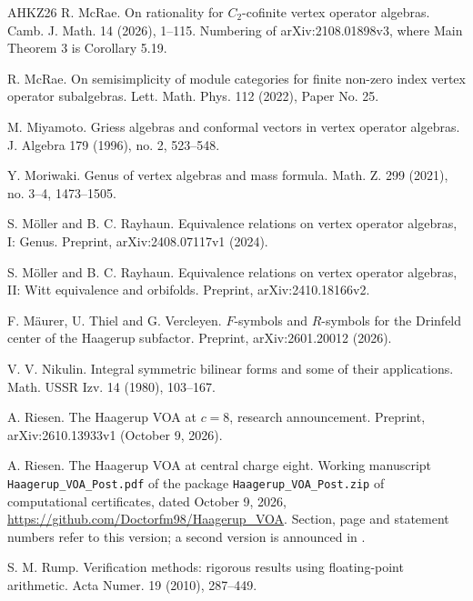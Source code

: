 \documentclass[leqno]{article}
\numberwithin{equation}{section}
\begin{document}
\begin{thebibliography}{AHKZ26}
R. McRae.
\newblock On rationality for $C_2$-cofinite vertex operator algebras.
\newblock Camb. J. Math. 14 (2026), 1--115. Numbering of arXiv:2108.01898v3, where Main Theorem 3 is Corollary 5.19.

R. McRae.
\newblock On semisimplicity of module categories for finite non-zero index vertex operator subalgebras.
\newblock Lett. Math. Phys. 112 (2022), Paper No. 25.

M. Miyamoto.
\newblock Griess algebras and conformal vectors in vertex operator algebras.
\newblock J. Algebra 179 (1996), no. 2, 523--548.

Y. Moriwaki.
\newblock Genus of vertex algebras and mass formula.
\newblock Math. Z. 299 (2021), no. 3--4, 1473--1505.

S. Möller and B. C. Rayhaun.
\newblock Equivalence relations on vertex operator algebras, I: Genus.
\newblock Preprint, arXiv:2408.07117v1 (2024).

S. Möller and B. C. Rayhaun.
\newblock Equivalence relations on vertex operator algebras, II: Witt equivalence and orbifolds.
\newblock Preprint, arXiv:2410.18166v2.

F. Mäurer, U. Thiel and G. Vercleyen.
\newblock $F$-symbols and $R$-symbols for the Drinfeld center of the Haagerup subfactor.
\newblock Preprint, arXiv:2601.20012 (2026).

V. V. Nikulin.
\newblock Integral symmetric bilinear forms and some of their applications.
\newblock Math. USSR Izv. 14 (1980), 103--167.

A. Riesen.
\newblock The Haagerup VOA at $c = 8$, research announcement.
\newblock Preprint, arXiv:2610.13933v1 (October 9, 2026).

A. Riesen.
\newblock The Haagerup VOA at central charge eight.
\newblock Working manuscript \texttt{Haagerup\_VOA\_Post.pdf} of the package \texttt{Haagerup\_VOA\_Post.zip} of computational certificates, dated October 9, 2026, \url{https://github.com/Doctorfm98/Haagerup_VOA}. Section, page and statement numbers refer to this version; a second version is announced in \cite{Rie26}.

S. M. Rump.
\newblock Verification methods: rigorous results using floating-point arithmetic.
\newblock Acta Numer. 19 (2010), 287--449.


\end{thebibliography}
\end{document}
